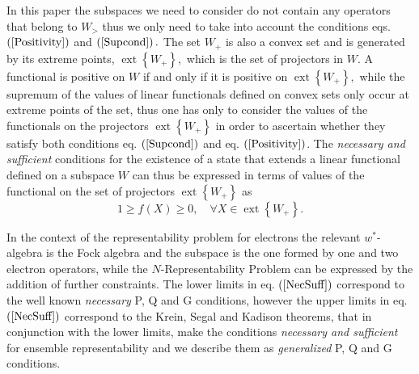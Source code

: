 \documentclass[aps,preprint]{revtex4}%
\begin{document}
In this paper the subspaces we need to consider do not contain any operators
that belong to $W_{>}$ thus we only need to take into account the conditions
eqs. $\left(  \ref{Positivity}\right)  $ and $\left(  \ref{Supcond}\right)  .$
The set $W_{+}$ is also a convex set and is generated by its extreme points,
$\operatorname*{ext}\left\{  W_{+}\right\}  ,$ which is the set of projectors
in $W.$ A functional is positive on $W$ if and only if it is positive on
$\operatorname*{ext}\left\{  W_{+}\right\}  ,$ while the supremum of the
values of linear functionals defined on convex sets only occur at extreme
points of the set, thus one has only to consider the values of the functionals
on the projectors $\operatorname*{ext}\left\{  W_{+}\right\}  $ in order to
ascertain whether they satisfy both conditions eq. $\left(  \ref{Supcond}%
\right)  $ and eq. $\left(  \ref{Positivity}\right)  $. The \emph{necessary
and sufficient }conditions for the existence of a state that extends a linear
functional defined on a subspace $W$ can thus be expressed in terms of values
of the functional on the set of projectors $\operatorname*{ext}\left\{
W_{+}\right\}  $ as
\begin{equation}
1\geq f\left(  X\right)  \geq0,\quad\forall X\in\operatorname*{ext}\left\{
W_{+}\right\}  . \label{NecSuff}%
\end{equation}


In the context of the representability problem for electrons the relevant
$w^{\ast}$-algebra is the Fock algebra and the subspace is the one formed by
one and two electron operators, while the $N$-Representability Problem can be
expressed by the addition of further constraints. The lower limits in eq.
$\left(  \ref{NecSuff}\right)  $ correspond to the well known \cite{PQG}
\emph{necessary} P, Q and G conditions, however the upper limits in eq.
$\left(  \ref{NecSuff}\right)  $ correspond to the Krein, Segal and Kadison
theorems, that in conjunction with the lower limits, make the conditions
\emph{necessary and sufficient }for ensemble representability and we describe
them as \emph{generalized }P, Q and G conditions.
\end{document}
